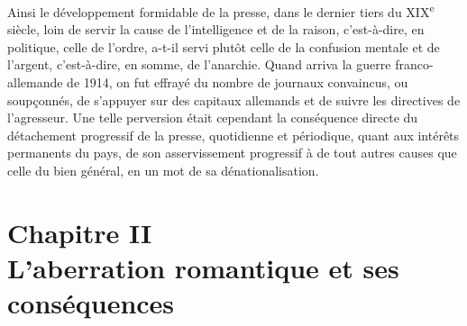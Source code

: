 \documentclass[french,twoside]{book} %
\newcommand\chapteropen{} %
\newcommand\chapterclose{} %
\begin{document}
Ainsi le développement formidable de la presse, dans le dernier tiers du XIX\textsuperscript{e} siècle, loin de servir la cause de l’intelligence et de la raison, c’est-à-dire, en politique, celle de l’ordre, a-t-il servi plutôt celle de la confusion mentale et de l’argent, c’est-à-dire, en somme, de l’anarchie. Quand arriva la guerre franco-allemande de 1914, on fut effrayé du nombre de journaux convaincus, ou soupçonnés, de s’appuyer sur des capitaux allemands et de suivre les directives de l’agresseur. Une telle perversion était cependant la conséquence directe du détachement progressif de la presse, quotidienne et périodique, quant aux intérêts permanents du pays, de son asservissement progressif à de tout autres causes que celle du bien général, en un mot de sa dénationalisation.
\chapterclose


\chapteropen
\chapter[{Chapitre II. L’aberration romantique et ses conséquences}]{Chapitre II\\
L’aberration romantique et ses conséquences}\renewcommand{\leftmark}{Chapitre II\\
L’aberration romantique et ses conséquences}
\end{document}
